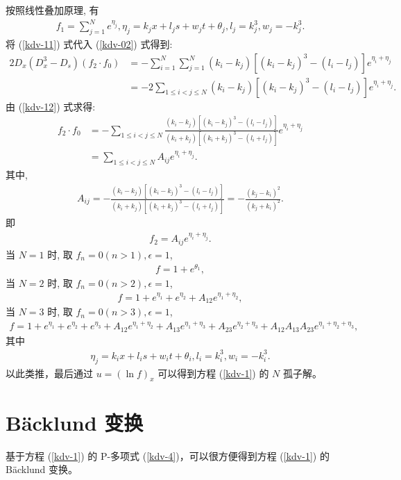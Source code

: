 按照线性叠加原理, 有
\begin{align}
f_1=\sum_{j=1}^{N}e^{\eta_j}, \eta_j=k_jx+l_js+w_jt+\theta_j, l_j=k_j^3, w_j=-k_j^3.\label{kdv-11}
\end{align}
将 (\ref{kdv-11}) 式代入 (\ref{kdv-02}) 式得到:
\begin{align}
2D_x(D_x^3-D_s)(f_2\cdot f_0)&=-\sum_{i=1}^N\sum_{j=1}^N(k_i-k_j)[(k_i-k_j)^3-(l_i-l_j)]e^{\eta_i+\eta_j}\nonumber\\
&=-2\sum_{1\leqslant i<j\leqslant N}(k_i-k_j)[(k_i-k_j)^3-(l_i-l_j)]e^{\eta_i+\eta_j}.\label{kdv-12}
\end{align}
由 (\ref{kdv-12}) 式求得:
\begin{align}
f_2\cdot f_0&=-\sum_{1\leqslant i<j\leqslant N}\frac{(k_i-k_j)[(k_i-k_j)^3-(l_i-l_j)]}{(k_i+k_j)[(k_i+k_j)^3-(l_i+l_j)]}e^{\eta_i+\eta_j}\nonumber\\
&=\sum_{1\leqslant i<j\leqslant N}A_{ij}e^{\eta_i+\eta_j}.\nonumber
\end{align}
其中,
\begin{align}
A_{ij}=-\frac{(k_i-k_j)[(k_i-k_j)^3-(l_i-l_j)]}{(k_i+k_j)[(k_i+k_j)^3-(l_i+l_j)]}=-\frac{(k_j-k_i)^2}{(k_j+k_i)^2}.\nonumber
\end{align}
即
\begin{align}
f_2=A_{ij}e^{\eta_i+\eta_j}.\nonumber
\end{align}
当 $N=1$ 时, 取 $f_n=0(n>1), \epsilon=1$,
\begin{align}
f=1+e^{\theta_1},
\end{align}
当 $N=2$ 时, 取 $f_n=0(n>2), \epsilon=1$,
\begin{align}
f=1+e^{\eta_1}+e^{\eta_2}+A_{12}e^{\eta_1+\eta_2},\nonumber
\end{align}
当 $N=3$ 时, 取 $f_n=0(n>3), \epsilon=1$,
\begin{align}
f=1+e^{\eta_1}+e^{\eta_2}+e^{\eta_3}+A_{12}e^{\eta_1+\eta_2}+A_{13}e^{\eta_1+\eta_3}+A_{23}e^{\eta_2+\eta_3}+A_{12}A_{13}A_{23}e^{\eta_1+\eta_2+\eta_3},\nonumber
\end{align}
其中 
\begin{align}
\eta_j=k_ix+l_is+w_it+\theta_i,\nonumber
l_i=k_i^3,\nonumber
w_i=-k_i^3.\nonumber
\end{align}
以此类推，最后通过 $u=(\ln f)_x$ 可以得到方程 (\ref{kdv-1}) 的 $N$ 孤子解。
\section{B\"{a}cklund 变换}
基于方程 (\ref{kdv-1}) 的 P-多项式 (\ref{kdv-4})，可以很方便得到方程 (\ref{kdv-1}) 的 B\"{a}cklund 变换。

